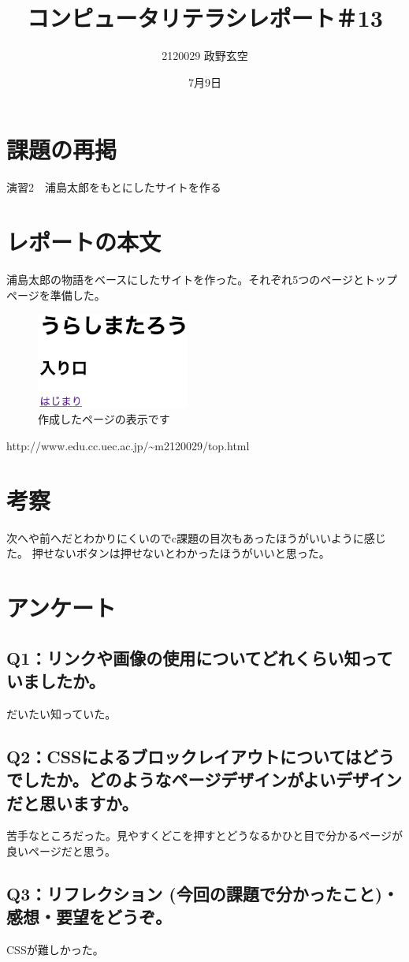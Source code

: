 \documentclass[12pt,a4j]{jarticle}
\begin{document}
\title{コンピュータリテラシレポート＃13}
\author{2120029 政野玄空}
\date{7月9日}
\maketitle


\section{課題の再掲}
演習2　浦島太郎をもとにしたサイトを作る

\section{レポートの本文}
浦島太郎の物語をベースにしたサイトを作った。それぞれ5つのページとトップページを準備した。
\begin{figure}[htbp]
\begin{center}
\includegraphics[width=5cm]{taro.eps}
\caption{作成したページの表示です}\label{fig1}
\end{center}
\end{figure}

http://www.edu.cc.uec.ac.jp/\~{}m2120029/top.html

\section{考察}
次へや前へだとわかりにくいのでc課題の目次もあったほうがいいように感じた。
押せないボタンは押せないとわかったほうがいいと思った。
\section{アンケート}

\subsection{Q1：リンクや画像の使用についてどれくらい知っていましたか。}
だいたい知っていた。

\subsection{Q2：CSSによるブロックレイアウトについてはどうでしたか。どのようなページデザインがよいデザインだと思いますか。}
苦手なところだった。見やすくどこを押すとどうなるかひと目で分かるページが良いページだと思う。

\subsection{Q3：リフレクション (今回の課題で分かったこと)・感想・要望をどうぞ。}
CSSが難しかった。
\end{document}
